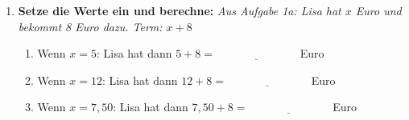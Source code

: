 \begin{enumerate}[label=\arabic*.]
    \item \textbf{Setze die Werte ein und berechne:}
    \textit{Aus Aufgabe 1a: Lisa hat $x$ Euro und bekommt 8 Euro dazu. Term: $x + 8$}
    \vspace{0.5cm}

    \begin{enumerate}[label=\alph*)]
        \item Wenn $x = 5$: Lisa hat dann $5 + 8 = \underline{\hspace{3cm}}$ Euro

        \vspace{0.5cm}

        \item Wenn $x = 12$: Lisa hat dann $12 + 8 = \underline{\hspace{3cm}}$ Euro

        \vspace{0.5cm}

        \item Wenn $x = 7{,}50$: Lisa hat dann $7{,}50 + 8 = \underline{\hspace{3cm}}$ Euro
    \end{enumerate}
\end{enumerate}